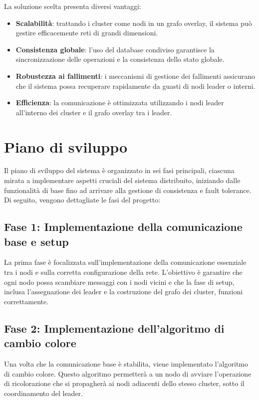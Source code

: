 \documentclass[12pt, a4paper]{report}
\begin{document}
La soluzione scelta presenta diversi vantaggi:

\begin{itemize}
    \item \textbf{Scalabilit\`a}: trattando i cluster come nodi in un grafo overlay, il sistema pu\`o gestire efficacemente reti di grandi dimensioni.
    \item \textbf{Consistenza globale}: l'uso del database condiviso garantisce la sincronizzazione delle operazioni e la consistenza dello stato globale.
    \item \textbf{Robustezza ai fallimenti}: i meccanismi di gestione dei fallimenti assicurano che il sistema possa recuperare rapidamente da guasti di nodi leader o interni.
    \item \textbf{Efficienza}: la comunicazione \`e ottimizzata utilizzando i nodi leader all'interno dei cluster e il grafo overlay tra i leader.
\end{itemize}

\section{Piano di sviluppo}

Il piano di sviluppo del sistema \`e organizzato in sei fasi principali, ciascuna mirata a implementare aspetti cruciali del sistema distribuito, iniziando dalle funzionalit\`a di base fino ad arrivare alla gestione di consistenza e fault tolerance. Di seguito, vengono dettagliate le fasi del progetto:

\subsection*{Fase 1: Implementazione della comunicazione base e setup}

La prima fase \`e focalizzata sull'implementazione della comunicazione essenziale tra i nodi e sulla corretta configurazione della rete. L'obiettivo \`e garantire che ogni nodo possa scambiare messaggi con i nodi vicini e che la fase di setup, inclusa l'assegnazione dei leader e la costruzione del grafo dei cluster, funzioni correttamente.

\subsection*{Fase 2: Implementazione dell'algoritmo di cambio colore}

Una volta che la comunicazione base \`e stabilita, viene implementato l'algoritmo di cambio colore. Questo algoritmo permetter\`a a un nodo di avviare l'operazione di ricolorazione che si propagher\`a ai nodi adiacenti dello stesso cluster, sotto il coordinamento del leader.
\end{document}
